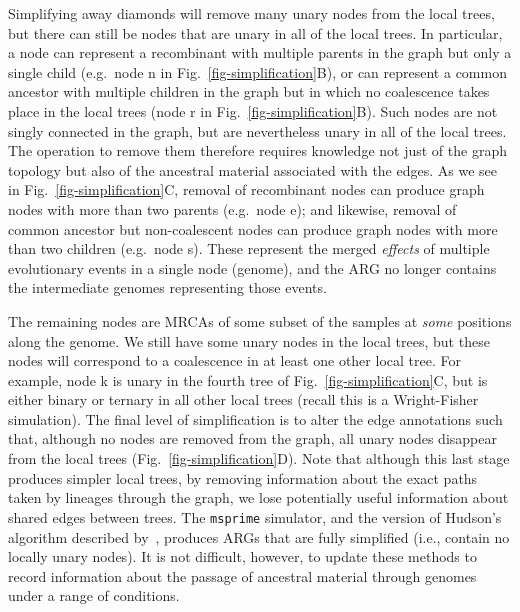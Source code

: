 \documentclass{article}
\newcommand{\noderef}[1]{\textsf{#1}}
\begin{document}
Simplifying away diamonds will remove many unary nodes from the
local trees, but there can still be nodes that are unary in all
of the local trees. In particular, a node can represent a recombinant
with multiple parents in the graph but only a single child (e.g.\ node \noderef{n}
in Fig.~\ref{fig-simplification}B), or can represent a common ancestor with
multiple children in the graph but in which no coalescence takes place
in the local trees
(node \noderef{r} in Fig.~\ref{fig-simplification}B).
Such nodes are not singly connected in the graph, but are nevertheless unary in
all of the local trees.
The operation to remove them
therefore requires knowledge not just of the graph topology but also of the
ancestral material associated with the edges.
As we see in Fig.~\ref{fig-simplification}C,
removal of recombinant nodes can produce graph nodes with
more than two parents (e.g.~node \noderef{e}); and likewise, removal of
common ancestor but non-coalescent nodes can produce graph nodes with
more than two children (e.g.~node \noderef{s}). These represent the
merged
\emph{effects} of multiple evolutionary events in a single node (genome), and the
ARG no longer contains the intermediate genomes representing those events.

The remaining nodes are MRCAs of some subset of the samples
at \emph{some} positions along the genome. We still have
some unary nodes in the local trees, but these nodes will
correspond to a coalescence in at least one other
local tree. For example, node  \noderef{k} is unary in the fourth tree
of Fig.~\ref{fig-simplification}C, but is either binary
or ternary in all other local trees (recall this is a Wright-Fisher
simulation). The final level of simplification is to alter the edge annotations
such that, although no nodes are removed from the graph, all
unary nodes disappear from the local trees (Fig.~\ref{fig-simplification}D).
Note that although this last stage produces simpler local trees, by
removing information about the exact paths taken by lineages through
the graph, we lose potentially useful information about shared edges
between trees.
The \texttt{msprime} simulator, and the version of Hudson's algorithm described
by~\citet{kelleher2016efficient}, produces ARGs
that are fully simplified (i.e., contain no locally unary nodes).
It is not difficult, however, to update
these methods to record information about the passage of ancestral
material through genomes under a range of conditions.
\end{document}

